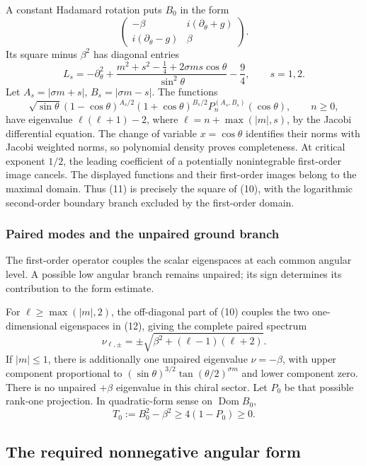\documentclass[11pt,a4paper]{article}
\begin{document}
A constant Hadamard rotation puts \(B_0\) in the form \[
 \begin{pmatrix}-\beta&i(\partial_\theta+g)\\
 i(\partial_\theta-g)&\beta\end{pmatrix}.
 \tag{10}
\] Its square minus \(\beta^2\) has diagonal entries \[
 L_s=-\partial_\theta^2+
 \frac{m^2+s^2-\tfrac14+2\sigma ms\cos\theta}{\sin^2\theta}
 -\frac94,\qquad s=1,2.
 \tag{11}
\] Let \(A_s=|\sigma m+s|\), \(B_s=|\sigma m-s|\). The functions \[
 \sqrt{\sin\theta}(1-\cos\theta)^{A_s/2}
 (1+\cos\theta)^{B_s/2}P_n^{(A_s,B_s)}(\cos\theta),\qquad n\ge0,
 \tag{12}
\] have eigenvalue \(\ell(\ell+1)-2\), where \(\ell=n+\max(|m|,s)\), by
the Jacobi differential equation. The change of variable
\(x=\cos\theta\) identifies their norms with Jacobi weighted norms, so
polynomial density proves completeness. At critical exponent \(1/2\),
the leading coefficient of a potentially nonintegrable first-order image
cancels. The displayed functions and their first-order images belong to
the maximal domain. Thus (11) is precisely the square of (10), with the logarithmic second-order boundary branch excluded by the first-order domain.

\subsubsection{Paired modes and the unpaired ground branch}\label{readable-static-branches}

The first-order operator couples the scalar eigenspaces at each common angular level. A possible low angular branch remains unpaired; its sign determines its contribution to the form estimate.

For \(\ell\ge\max(|m|,2)\), the off-diagonal part of (10) couples the
two one-dimensional eigenspaces in (12), giving the complete paired
spectrum \[
 \nu_{\ell,\pm}=\pm\sqrt{\beta^2+(\ell-1)(\ell+2)}.
 \tag{13}
\] If \(|m|\le1\), there is additionally one unpaired eigenvalue
\(\nu=-\beta\), with upper component proportional to
\((\sin\theta)^{3/2}\tan(\theta/2)^{\sigma m}\) and lower component
zero. There is no unpaired \(+\beta\) eigenvalue in this chiral sector.
Let \(P_0\) be that possible rank-one projection. In quadratic-form
sense on \(\operatorname{Dom}B_0\), \[
 T_0:=B_0^2-\beta^2\ge4(1-P_0)\ge0.
 \tag{14}
\]

\subsection{The required nonnegative angular
form}\label{the-required-nonnegative-angular-form}
\end{document}
